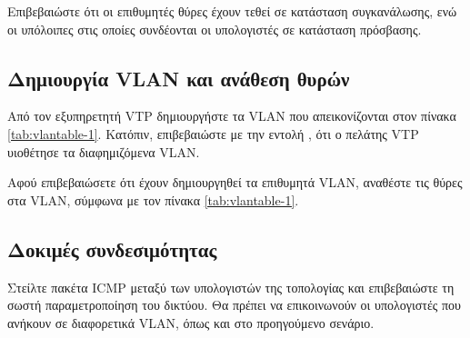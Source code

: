 \documentclass{EdipyLabs} %
\begin{document}
Επιβεβαιώστε ότι οι επιθυμητές θύρες έχουν τεθεί σε κατάσταση συγκανάλωσης, ενώ οι υπόλοιπες στις οποίες συνδέονται οι υπολογιστές σε κατάσταση πρόσβασης.

\subsection{Δημιουργία VLAN και ανάθεση θυρών}

Από τον εξυπηρετητή VTP δημιουργήστε τα VLAN που απεικονίζονται στον πίνακα \ref{tab:vlantable-1}. Κατόπιν, επιβεβαιώστε με την εντολή , ότι ο πελάτης VTP υιοθέτησε τα διαφημιζόμενα VLAN.


Αφού επιβεβαιώσετε ότι έχουν δημιουργηθεί τα επιθυμητά VLAN, αναθέστε τις θύρες στα VLAN, σύμφωνα με τον πίνακα \ref{tab:vlantable-1}.

\subsection{Δοκιμές συνδεσιμότητας}
Στείλτε πακέτα ICMP μεταξύ των υπολογιστών της τοπολογίας και επιβεβαιώστε τη σωστή παραμετροποίηση του δικτύου. Θα πρέπει να επικοινωνούν οι υπολογιστές που ανήκουν σε διαφορετικά VLAN, όπως και στο προηγούμενο σενάριο.
\end{document}
